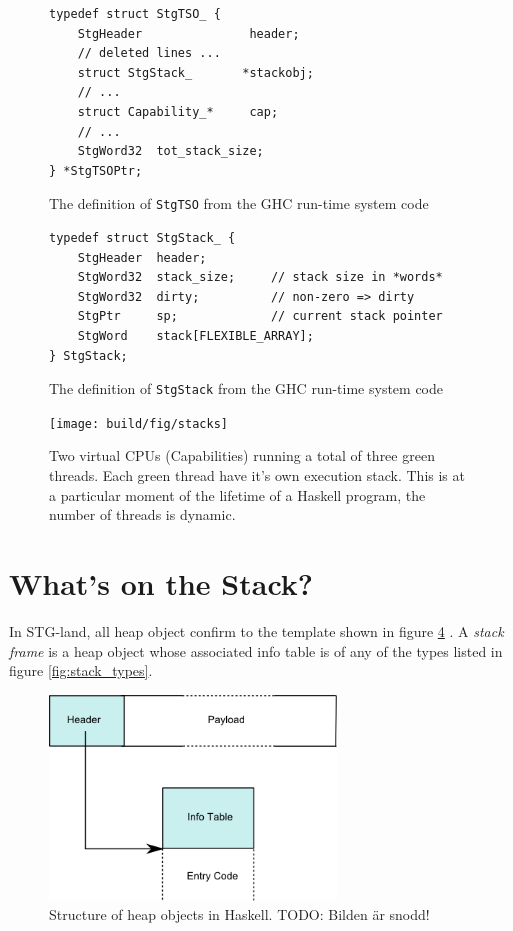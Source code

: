 \begin{figure}
\begin{mdframed}
  \begin{verbatim}
typedef struct StgTSO_ {
    StgHeader               header;
    // deleted lines ...
    struct StgStack_       *stackobj;
    // ...
    struct Capability_*     cap;
    // ...
    StgWord32  tot_stack_size;
} *StgTSOPtr;
  \end{verbatim}
  \caption{The definition of \texttt{StgTSO} from the GHC run-time system
code}
  \label{fig:tso_definition}
\end{mdframed}
\end{figure}

\begin{figure}
\begin{mdframed}
  \begin{verbatim}
typedef struct StgStack_ {
    StgHeader  header;
    StgWord32  stack_size;     // stack size in *words*
    StgWord32  dirty;          // non-zero => dirty
    StgPtr     sp;             // current stack pointer
    StgWord    stack[FLEXIBLE_ARRAY];
} StgStack;
  \end{verbatim}
  \caption{The definition of \texttt{StgStack} from the GHC run-time system
code}
  \label{fig:stack_definition}
\end{mdframed}
\end{figure}

\begin{figure}
  \centering
  \texttt{[image: build/fig/stacks]}
  \caption{Two virtual CPUs (Capabilities) running a total of three
green threads. Each green thread have it's own execution stack.
This is at a particular moment of the lifetime of a Haskell program,
the number of threads is dynamic.} %
  \label{fig:stacks}
\end{figure}

\section{What's on the Stack?}

In STG-land, all heap object confirm to the template shown in figure \ref{fig:heap_object} \cite{commentary_heap_objects}.
A \emph{stack frame} is a heap object whose
associated info table is of any of the types listed in figure \ref{fig:stack_types}.

\begin{figure}
  \centering
  \includegraphics[width=3.0in]{fig/heap-object}
  \caption{Structure of heap objects in Haskell. TODO: Bilden är snodd!}
  \label{fig:heap_object}
\end{figure}

